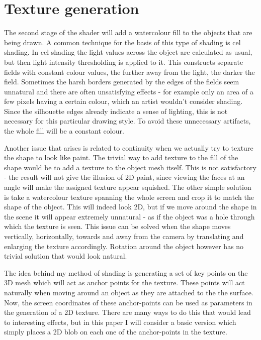 \documentclass[a4paper, 12pt]{article}
\begin{document}
\section{Texture generation}

The second stage of the shader will add a watercolour fill to the objects that are being drawn. A common technique for the basis of this type of shading is cel shading. In cel shading the light values across the object are calculated as usual, but then light intensity thresholding is applied to it. This constructs separate fields with constant colour values, the further away from the light, the darker the field. Sometimes the harsh borders generated by the edges of the fields seem unnatural and there are often unsatisfying effects - for example only an area of a few pixels having a certain colour, which an artist wouldn't consider shading. Since the silhouette edges already indicate a sense of lighting, this is not necessary for this particular drawing style. To avoid these unnecessary artifacts, the whole fill will be a constant colour.

Another issue that arises is related to continuity when we actually try to texture the shape to look like paint. The trivial way to add texture to the fill of the shape would be to add a texture to the object mesh itself. This is not satisfactory - the result will not give the illusion of 2D paint, since viewing the faces at an angle will make the assigned texture appear squished. The other simple solution is take a watercolour texture spanning the whole screen and crop it to match the shape of the object. This will indeed look 2D, but if we move around the shape in the scene it will appear extremely unnatural - as if the object was a hole through which the texture is seen. This issue can be solved when the shape moves vertically, horizontally, towards and away from the camera by translating and enlarging the texture accordingly. Rotation around the object however has no trivial solution that would look natural.

The idea behind my method of shading is generating a set of key points on the 3D mesh which will act as anchor points for the texture. These points will act naturally when moving around an object as they are attached to the the surface. Now, the screen coordinates of these anchor-points can be used as parameters in the generation of a 2D texture. There are many ways to do this that would lead to interesting effects, but in this paper I will consider a basic version which simply places a 2D blob on each one of the anchor-points in the texture.
\end{document}
